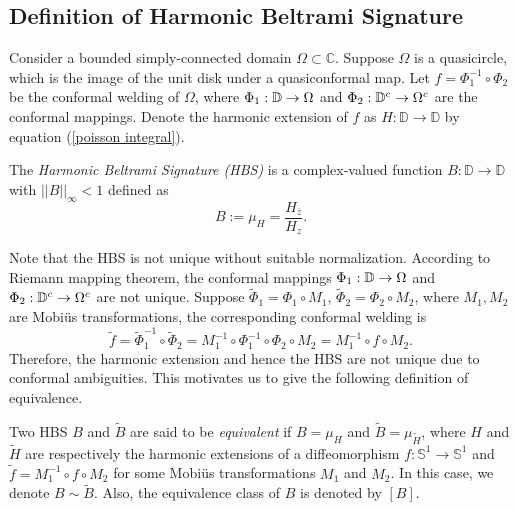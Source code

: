 \documentclass[review,onefignum,onetabnum]{siamonline190516}
\begin{document}
\subsection{Definition of Harmonic Beltrami Signature}
Consider a bounded simply-connected domain $\Omega\subset \mathbb{C}$. Suppose $\Omega$ is a quasicircle, which is the image of the unit disk under a quasiconformal map. Let $f = \Phi_1^{-1} \circ \Phi_2$ be the conformal welding of $\Omega$, where  $\Phi_1: \mathbb{D} \rightarrow \Omega$ and $\Phi_2: \mathbb{D}^c \rightarrow \Omega^c$ are the conformal mappings. Denote the harmonic extension of $f$ as $H:\mathbb{D}\to \mathbb{D}$ by equation (\ref{poisson integral}).

\begin{definition}
The {\it Harmonic Beltrami Signature (HBS)} is a complex-valued function $B:\mathbb{D}\to \mathbb{D}$ with $||B||_{\infty}<1$ defined as
\begin{equation}
        B:= \mu_H = \frac{H_{\overline{z}}}{H_z}.
\end{equation}
\end{definition}

Note that the HBS is not unique without suitable normalization. According to Riemann mapping theorem, the conformal mappings $\Phi_1: \mathbb{D} \rightarrow \Omega$ and $\Phi_2: \mathbb{D}^c \rightarrow \Omega^c$ are not unique. Suppose $\tilde{\Phi}_1 = \Phi_1 \circ M_1$, $\tilde{\Phi}_2 = \Phi_2 \circ M_2$, where $M_1, M_2$ are Mobi\"us transformations, the corresponding conformal welding is
\begin{equation}\label{tilde f}
    \tilde{f} = \tilde{\Phi}_1^{-1} \circ \tilde{\Phi}_2 = M_1^{-1} \circ \Phi_1^{-1} \circ \Phi_2 \circ M_2 = M_1^{-1} \circ f \circ M_2.
\end{equation}
Therefore, the harmonic extension and hence the HBS are not unique due to conformal ambiguities. This motivates us to give the following definition of equivalence.

\begin{definition}
Two HBS $B$ and $\tilde{B}$ are said to be {\it equivalent} if $B=\mu_H$ and $\tilde{B} = \mu_{\tilde{H}}$, where $H$ and $\tilde{H}$ are respectively the harmonic extensions of a diffeomorphism $f:\mathbb{S}^1\to \mathbb{S}^1$ and $\tilde{f} = M_1^{-1} \circ f \circ M_2$ for some Mobi\"us transformations $M_1$ and $M_2$. In this case, we denote $B \sim \tilde{B}$. Also, the equivalence class of $B$ is denoted by $[B]$.
\end{definition}
\end{document}
